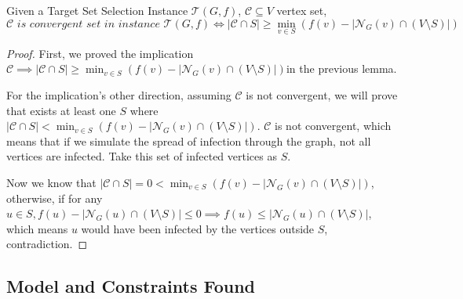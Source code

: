 \begin{mytheo} Given a Target Set Selection Instance $\mathcal{T}(G, f)$, $\mathcal{C} \subseteq V$ vertex set,   
\begin{equation}
\mathcal{C} \textit{ is convergent set in instance } \mathcal{T}(G, f) \iff |\mathcal{C} \cap S|\geq  \min_{v \in S} (f(v) - |\mathcal{N}_G(v) \cap (V \setminus S)| ) 
\end{equation}\end{mytheo} 
\begin{proof}
First, we proved the implication $\mathcal{C} \implies |\mathcal{C} \cap S| \geq  \min_{v \in S} (f(v) - |\mathcal{N}_G(v) \cap (V \setminus S)| )  $in the previous lemma. 

For the implication's other direction, assuming $\mathcal{C}$ is not convergent, we will prove that exists at least one $S$ where $|\mathcal{C} \cap S| <  \min_{v \in S} (f(v) - |\mathcal{N}_G(v) \cap (V \setminus S)| )  $. $\mathcal{C}$ is not convergent,  which means that if we simulate the spread of infection through the graph, not all vertices are infected. Take this set of infected vertices as $S$. 

Now we know that $ |\mathcal{C} \cap S| = 0 < \min_{v \in S} (f(v) - |\mathcal{N}_G(v) \cap (V \setminus S)| )$, otherwise, if for any $u \in S, f(u) - |\mathcal{N}_G(u) \cap (V \setminus S)| \leq 0 \implies f(u) \leq   |\mathcal{N}_G(u) \cap (V \setminus S)|$, which means $u$ would have been infected by the vertices outside $S$, contradiction.
\end{proof}


\subsection{Model and Constraints Found}

